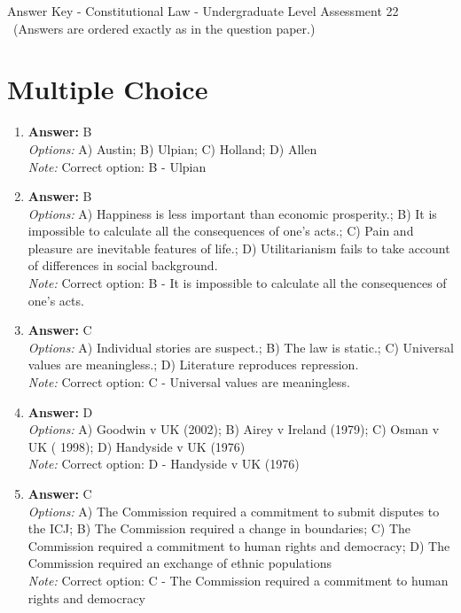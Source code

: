 \documentclass[12pt]{article}
\begin{document}
\begin{center}
Answer Key - Constitutional Law - Undergraduate Level Assessment 22 \
\small (Answers are ordered exactly as in the question paper.)
\end{center}

\section*{Multiple Choice}
\begin{enumerate}[label=\arabic*.]
\item \textbf{Answer:} B
\\ \textit{Options:} A) Austin; B) Ulpian; C) Holland; D) Allen
\\ \textit{Note:} Correct option: B - Ulpian
\item \textbf{Answer:} B
\\ \textit{Options:} A) Happiness is less important than economic prosperity.; B) It is impossible to calculate all the consequences of one's acts.; C) Pain and pleasure are inevitable features of life.; D) Utilitarianism fails to take account of differences in social background.
\\ \textit{Note:} Correct option: B - It is impossible to calculate all the consequences of one's acts.
\item \textbf{Answer:} C
\\ \textit{Options:} A) Individual stories are suspect.; B) The law is static.; C) Universal values are meaningless.; D) Literature reproduces repression.
\\ \textit{Note:} Correct option: C - Universal values are meaningless.
\item \textbf{Answer:} D
\\ \textit{Options:} A) Goodwin v UK (2002); B) Airey v Ireland (1979); C) Osman v UK ( 1998); D) Handyside v UK (1976)
\\ \textit{Note:} Correct option: D - Handyside v UK (1976)
\item \textbf{Answer:} C
\\ \textit{Options:} A) The Commission required a commitment to submit disputes to the ICJ; B) The Commission required a change in boundaries; C) The Commission required a commitment to human rights and democracy; D) The Commission required an exchange of ethnic populations
\\ \textit{Note:} Correct option: C - The Commission required a commitment to human rights and democracy
\end{enumerate}
\end{document}
